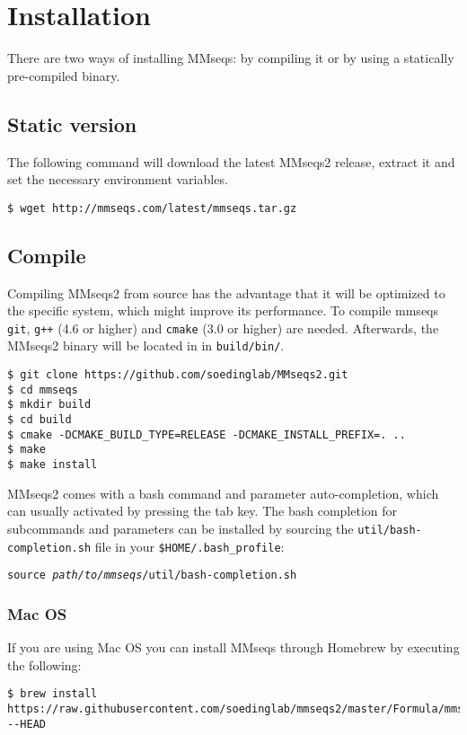 \documentclass[11pt,a4paper]{scrreprt}
\begin{document}
\clearpage


\section{Installation}


There are two ways of installing MMseqs: by compiling it or by using a statically pre-compiled binary. 
\subsection{Static version}
The following command will download the latest MMseqs2 release, extract it and set the necessary environment variables.


\begin{verbatim}
$ wget http://mmseqs.com/latest/mmseqs.tar.gz
\end{verbatim}
\subsection{Compile}
Compiling MMseqs2 from source has the advantage that it will be optimized to the specific system, which might improve its performance. To compile mmseqs \texttt{git}, \texttt{g++} (4.6 or higher) and \texttt{cmake} (3.0 or higher) are needed. Afterwards, the MMseqs2 binary will be located in in \texttt{build/bin/}.


\begin{verbatim}
$ git clone https://github.com/soedinglab/MMseqs2.git
$ cd mmseqs
$ mkdir build
$ cd build
$ cmake -DCMAKE_BUILD_TYPE=RELEASE -DCMAKE_INSTALL_PREFIX=. ..
$ make 
$ make install 
\end{verbatim}


MMseqs2 comes with a bash command and parameter auto-completion, which can usually activated by pressing the tab key. The bash completion for subcommands and parameters can be installed by sourcing the \texttt{util/bash-completion.sh} file in your \texttt{\$HOME/.bash\_profile}:
\begin{flushleft}
\texttt{source \textit{path/to/mmseqs}/util/bash-completion.sh}
\end{flushleft}


\subsubsection{Mac OS}
If you are using Mac OS you can install MMseqs through Homebrew by executing the following:
\begin{Verbatim}[fontsize=\footnotesize]
$ brew install https://raw.githubusercontent.com/soedinglab/mmseqs2/master/Formula/mmseqs.rb --HEAD
\end{Verbatim}
\end{document}
